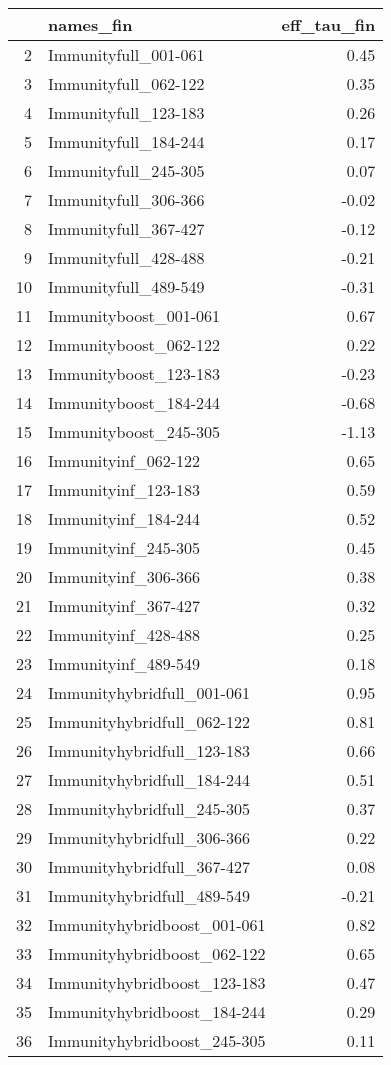 \begin{table}[ht]
\centering
\begin{tabular}{rlr}
  \hline
 & names\_fin & eff\_tau\_fin \\ 
  \hline
2 & Immunityfull\_001-061 & 0.45 \\ 
  3 & Immunityfull\_062-122 & 0.35 \\ 
  4 & Immunityfull\_123-183 & 0.26 \\ 
  5 & Immunityfull\_184-244 & 0.17 \\ 
  6 & Immunityfull\_245-305 & 0.07 \\ 
  7 & Immunityfull\_306-366 & -0.02 \\ 
  8 & Immunityfull\_367-427 & -0.12 \\ 
  9 & Immunityfull\_428-488 & -0.21 \\ 
  10 & Immunityfull\_489-549 & -0.31 \\ 
  11 & Immunityboost\_001-061 & 0.67 \\ 
  12 & Immunityboost\_062-122 & 0.22 \\ 
  13 & Immunityboost\_123-183 & -0.23 \\ 
  14 & Immunityboost\_184-244 & -0.68 \\ 
  15 & Immunityboost\_245-305 & -1.13 \\ 
  16 & Immunityinf\_062-122 & 0.65 \\ 
  17 & Immunityinf\_123-183 & 0.59 \\ 
  18 & Immunityinf\_184-244 & 0.52 \\ 
  19 & Immunityinf\_245-305 & 0.45 \\ 
  20 & Immunityinf\_306-366 & 0.38 \\ 
  21 & Immunityinf\_367-427 & 0.32 \\ 
  22 & Immunityinf\_428-488 & 0.25 \\ 
  23 & Immunityinf\_489-549 & 0.18 \\ 
  24 & Immunityhybridfull\_001-061 & 0.95 \\ 
  25 & Immunityhybridfull\_062-122 & 0.81 \\ 
  26 & Immunityhybridfull\_123-183 & 0.66 \\ 
  27 & Immunityhybridfull\_184-244 & 0.51 \\ 
  28 & Immunityhybridfull\_245-305 & 0.37 \\ 
  29 & Immunityhybridfull\_306-366 & 0.22 \\ 
  30 & Immunityhybridfull\_367-427 & 0.08 \\ 
  31 & Immunityhybridfull\_489-549 & -0.21 \\ 
  32 & Immunityhybridboost\_001-061 & 0.82 \\ 
  33 & Immunityhybridboost\_062-122 & 0.65 \\ 
  34 & Immunityhybridboost\_123-183 & 0.47 \\ 
  35 & Immunityhybridboost\_184-244 & 0.29 \\ 
  36 & Immunityhybridboost\_245-305 & 0.11 \\ 
   \hline
\end{tabular}
\end{table}
